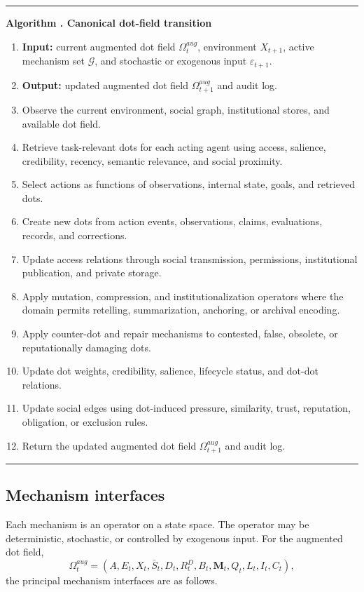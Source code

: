 \documentclass[11pt]{article}
\theoremstyle{remark}
\newcounter{algorithmbox}
\newenvironment{algorithmblock}[1]{%
\refstepcounter{algorithmbox}%
\par\medskip
\noindent\begin{minipage}{\linewidth}
\hrule\vspace{0.45em}
\textbf{Algorithm \thealgorithmbox. #1}\par\vspace{0.25em}
\begin{enumerate}[leftmargin=*,label=\arabic*.]
}{%
\end{enumerate}
\vspace{0.2em}\hrule
\end{minipage}\medskip
}
\begin{document}
\begin{algorithmblock}{Canonical dot-field transition}
\label{alg:dot-field-transition}
\item \textbf{Input:} current augmented dot field $\Omega_t^{aug}$, environment $X_{t+1}$, active mechanism set $\mathcal G$, and stochastic or exogenous input $\varepsilon_{t+1}$.
\item \textbf{Output:} updated augmented dot field $\Omega_{t+1}^{aug}$ and audit log.
\item Observe the current environment, social graph, institutional stores, and available dot field.
\item Retrieve task-relevant dots for each acting agent using access, salience, credibility, recency, semantic relevance, and social proximity.
\item Select actions as functions of observations, internal state, goals, and retrieved dots.
\item Create new dots from action events, observations, claims, evaluations, records, and corrections.
\item Update access relations through social transmission, permissions, institutional publication, and private storage.
\item Apply mutation, compression, and institutionalization operators where the domain permits retelling, summarization, anchoring, or archival encoding.
\item Apply counter-dot and repair mechanisms to contested, false, obsolete, or reputationally damaging dots.
\item Update dot weights, credibility, salience, lifecycle status, and dot-dot relations.
\item Update social edges using dot-induced pressure, similarity, trust, reputation, obligation, or exclusion rules.
\item Return the updated augmented dot field $\Omega_{t+1}^{aug}$ and audit log.
\end{algorithmblock}


\subsection{Mechanism interfaces}\label{mechanism-interfaces}

Each mechanism is an operator on a state space. The operator may be deterministic, stochastic, or controlled by exogenous input. For the augmented dot field,
\[
\Omega_t^{aug}=(A,E_t,X_t,\bar S_t,D_t,R_t^D,B_t,\mathbf M_t,Q_t,L_t,I_t,C_t),
\]
the principal mechanism interfaces are as follows.
\end{document}
